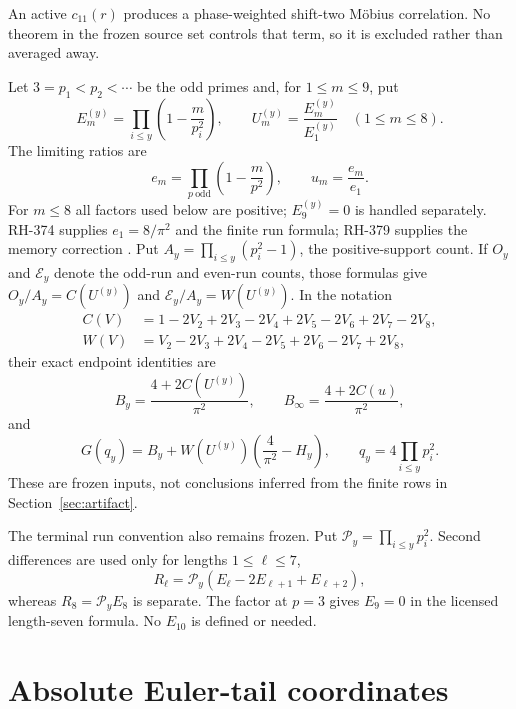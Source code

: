 \documentclass[11pt]{article}
\theoremstyle{definition}
\theoremstyle{remark}
\begin{document}
An active $c_{11}(r)$ produces a phase-weighted shift-two M\"obius
correlation.  No theorem in the frozen source set controls that term, so it
is excluded rather than averaged away.

Let $3=p_1<p_2<\cdots$ be the odd primes and, for $1\le m\le9$, put
\begin{equation}
 E_m^{(y)}=\prod_{i\le y}\left(1-\frac m{p_i^2}\right),
 \qquad
 U_m^{(y)}=\frac{E_m^{(y)}}{E_1^{(y)}}\quad(1\le m\le8).
 \label{eq:finite-ratios}
\end{equation}
The limiting ratios are
\begin{equation}
 e_m=\prod_{p\ \mathrm{odd}}\left(1-\frac m{p^2}\right),
 \qquad u_m=\frac{e_m}{e_1}.
 \label{eq:limit-ratios}
\end{equation}
For $m\le8$ all factors used below are positive; $E_9^{(y)}=0$ is handled
separately.  RH-374 supplies $e_1=8/\pi^2$ and the finite run formula;
RH-379 supplies the memory correction \cite{RH374,RH379}.  Put
$A_y=\prod_{i\le y}(p_i^2-1)$, the positive-support count.  If $O_y$ and
$\mathcal E_y$ denote the odd-run and even-run counts, those formulas give
$O_y/A_y=C(U^{(y)})$ and $\mathcal E_y/A_y=W(U^{(y)})$.  In the notation
\begin{align}
 C(V)&=1-2V_2+2V_3-2V_4+2V_5-2V_6+2V_7-2V_8,\\
 W(V)&=V_2-2V_3+2V_4-2V_5+2V_6-2V_7+2V_8,
 \label{eq:CW}
\end{align}
their exact endpoint identities are
\begin{equation}
 B_y=\frac{4+2C(U^{(y)})}{\pi^2},\qquad
 B_\infty=\frac{4+2C(u)}{\pi^2},
 \label{eq:B-endpoints}
\end{equation}
and
\begin{equation}
 G(q_y)=B_y+W(U^{(y)})\left(\frac4{\pi^2}-H_y\right),
 \qquad q_y=4\prod_{i\le y}p_i^2.
 \label{eq:G-endpoint}
\end{equation}
These are frozen inputs, not conclusions inferred from the finite rows in
Section~\ref{sec:artifact}.

The terminal run convention also remains frozen.  Put
$\mathcal P_y=\prod_{i\le y}p_i^2$.  Second differences are used only for
lengths $1\le\ell\le7$,
\[
 R_\ell=\mathcal P_y(E_\ell-2E_{\ell+1}+E_{\ell+2}),
\]
whereas $R_8=\mathcal P_yE_8$ is separate.  The factor at $p=3$ gives $E_9=0$ in
the licensed length-seven formula.  No $E_{10}$ is defined or needed.

\section{Absolute Euler-tail coordinates}
\end{document}
